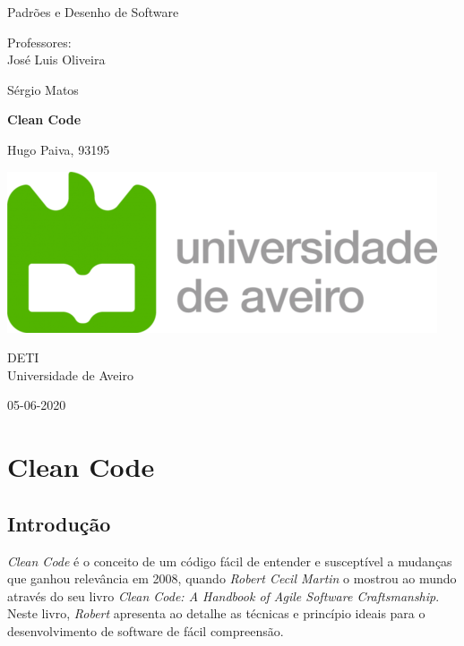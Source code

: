 \documentclass[10pt,portuguese]{article}
\begin{document}
\begin{titlepage}
	\clearpage\thispagestyle{empty}
	\centering
	\vspace{2cm}

	
	{\Large  Padrões e Desenho de Software \par}
	\vspace{0.5cm}
	{\small Professores: \\
	José Luis Oliveira\par
	Sérgio Matos\par}
	\vspace{4cm}
	{\Huge \textbf{Clean Code}} \\
	\vspace{1cm}
	\vspace{4cm}
	{\normalsize  Hugo Paiva, 93195
	   \par}
	 
	\vspace{2cm}

    \includegraphics[scale=0.20]{logo_ua.png}
    
    \vspace{2cm}
    
	{\normalsize DETI \\ 
		Universidade de Aveiro \par}
		
	{\normalsize 05-06-2020 \par}
	\vspace{2cm}
		
	
	\pagebreak

\end{titlepage}
\tableofcontents{}
\clearpage

\section{Clean Code}
\subsection{Introdução}

\par \textit{Clean Code} é o conceito de um código fácil de entender e susceptível a mudanças que ganhou relevância em 2008, quando \textit{Robert Cecil Martin} o mostrou ao mundo através do seu livro \textit{Clean Code: A Handbook of Agile Software Craftsmanship}. Neste livro, \textit{Robert} apresenta ao detalhe as técnicas e princípio ideais para o desenvolvimento de software de fácil compreensão.
\end{document}
